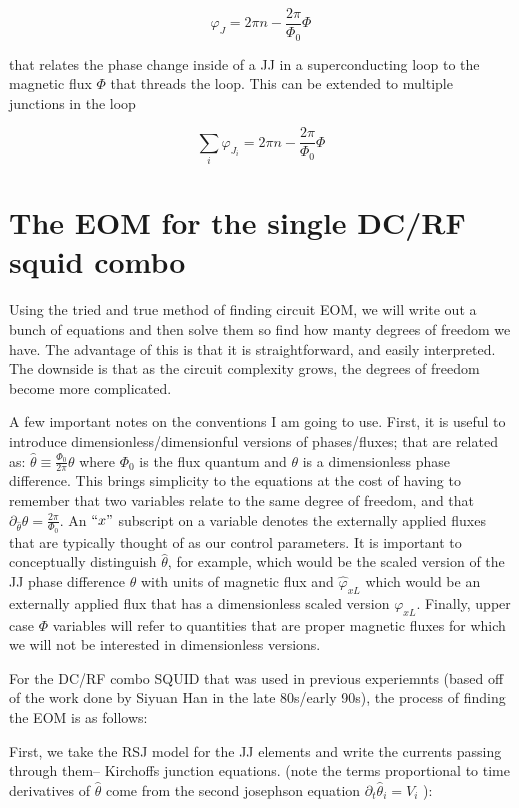 \documentclass[paper=a4, twocolumn, fontsize=10pt]{article} %
\numberwithin{equation}{section} %
\numberwithin{figure}{section} %
\numberwithin{table}{section} %
\def \df#1{\hat{#1}}
\def \dl#1{#1}
\begin{document}
\[ \varphi_J = 2\pi n - \frac{2\pi}{\Phi_0} \Phi \]

that relates the phase change inside of a JJ in a superconducting loop to the magnetic flux $\Phi$ that threads the loop. This can be extended to multiple junctions in the loop

\[ \sum_i \varphi_{J_i} = 2\pi n - \frac{2\pi}{\Phi_0} \Phi \]


\section{The EOM for the single DC/RF squid combo}

Using the tried and true method of finding circuit EOM, we will write out a bunch of equations and then solve them so find how manty degrees of freedom we have. The advantage of this is that it is straightforward, and easily interpreted. The downside is that as the circuit complexity grows, the degrees of freedom become more complicated.

A few important notes on the conventions I am going to use. First, it is useful to introduce dimensionless/dimensionful versions of phases/fluxes; that are related as: $ \df \theta \equiv  \frac{\Phi_0}{2\pi} \dl\theta  $ where $\Phi_0$ is the flux quantum and $\theta$ is a dimensionless phase difference. This brings simplicity to the equations at the cost of having to remember that two variables relate to the same degree of freedom, and that $ \partial_{\df \theta} {\dl\theta} = \frac{2\pi}{\Phi_0}$. An $``x"$ subscript on a variable denotes the externally applied fluxes that are typically thought of as our control parameters. It is important to conceptually distinguish $\df\theta$, for example, which would be the scaled version of the JJ phase difference $\dl\theta$ with units of magnetic flux and  $\df\varphi_{xL}$ which would be an externally applied flux that has a dimensionless scaled version $\dl\varphi_{xL}$. Finally, upper case $\Phi$ variables will refer to quantities that are proper magnetic fluxes for which we will not be interested in dimensionless versions.


For the DC/RF combo SQUID that was used in previous experiemnts (based off of the work done by Siyuan Han in the late 80s/early 90s), the process of finding the EOM is as follows:

First, we take the RSJ model for the JJ elements and write the currents passing through them-- Kirchoffs junction equations. (note the terms proportional to time derivatives of $\df \theta$ come from the second josephson equation $\partial_t \df \theta_i =  V_i $ ):
\end{document}
